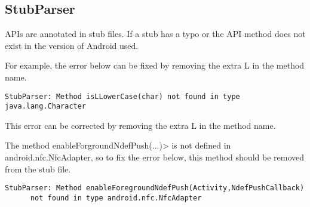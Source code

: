 \subsection{StubParser}

APIs are annotated in stub files.  If a stub has a typo or the API method does not exist in the version of Android 
used. 

For example, the error below can be fixed by removing the extra L in the method name.

\begin{Verbatim}
StubParser: Method isLLowerCase(char) not found in type java.lang.Character
\end{Verbatim}
This error can be corrected by removing the extra L in the method name.

The method \<enableForgroundNdefPush(...)> is not defined in android.nfc.NfcAdapter, so to fix the error below, this
 method should be removed from the stub file.
\begin{Verbatim}
StubParser: Method enableForegroundNdefPush(Activity,NdefPushCallback) 
      not found in type android.nfc.NfcAdapter
\end{Verbatim}



